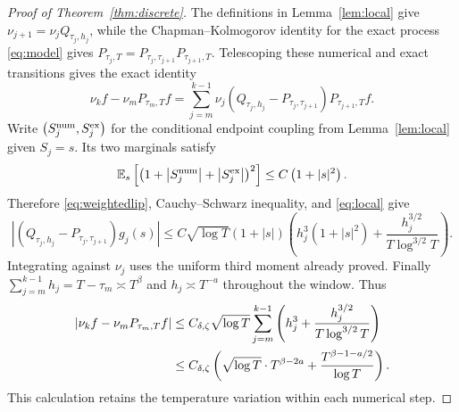 \documentclass[11pt]{article}
\theoremstyle{definition}
\newcommand{\E}{\mathbb E}
\begin{document}
\begin{proof}[Proof of Theorem~\ref{thm:discrete}]
The definitions in Lemma~\ref{lem:local} give
$\nu_{j+1}=\nu_jQ_{\tau_j,h_j}$, while the Chapman--Kolmogorov identity for
the exact process \eqref{eq:model} gives
$P_{\tau_j,T}=P_{\tau_j,\tau_{j+1}}P_{\tau_{j+1},T}$. Telescoping these
numerical and exact transitions gives the exact identity
\[
 \nu_k f-\nu_mP_{\tau_m,T}f
 =\sum_{j=m}^{k-1}\nu_j
           \left(Q_{\tau_j,h_j}-P_{\tau_j,\tau_{j+1}}\right)P_{\tau_{j+1},T}f.
\]
Write $\left(S_j^{\rm num},S_j^{\rm ex}\right)$ for the conditional endpoint coupling
from Lemma~\ref{lem:local} given $S_j=s$. Its two marginals satisfy
\[
 \E_s\left[\left(1+\left|S_j^{\rm num}\right|+\left|S_j^{\rm ex}\right|\right)^2\right]
 \leq C\left(1+|s|^2\right).
\]
Therefore \eqref{eq:weightedlip}, Cauchy--Schwarz inequality, and \eqref{eq:local} give
\[
 \left|\left(Q_{\tau_j,h_j}-P_{\tau_j,\tau_{j+1}}\right)g_j(s)\right|
 \leq C\sqrt{\log T}(1+|s|)
       \left(h_j^3\left(1+|s|^2\right)
                    +\frac{h_j^{3/2}}{T\log^{3/2}T}\right).
\]
Integrating against $\nu_j$ uses the uniform third moment already proved.
Finally $\sum_{j=m}^{k-1}h_j=T-\tau_m\asymp T^\beta$ and
$h_j\asymp T^{-a}$ throughout the window. Thus
\begin{align}\label{eq:telescoping}
 |\nu_k f-\nu_mP_{\tau_m,T}f|
 &\leq C_{\delta,\zeta}\sqrt{\log T}
       \sum_{j=m}^{k-1}\left(h_j^3+
                      \frac{h_j^{3/2}}{T\log^{3/2}T}\right)\notag\\
 &\leq C_{\delta,\zeta}\left(
       \sqrt{\log T}\cdot T^{\beta-2a}
              +\frac{T^{\beta-1-a/2}}{\log T}\right).
\end{align}
This calculation retains the temperature variation within each numerical step.


\end{proof}
\end{document}
